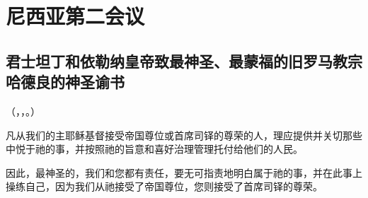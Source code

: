 
\chapter{尼西亚第二会议}



\section{君士坦丁和依勒纳皇帝致最神圣、最蒙福的旧罗马教宗哈德良的神圣谕书}

（，，。）\par

凡从我们的主耶稣基督接受帝国尊位或首席司铎的尊荣的人，理应提供并关切那些中悦于祂的事，并按照祂的旨意和喜好治理管理托付给他们的人民。\par

因此，最神圣的，我们和您都有责任，要无可指责地明白属于祂的事，并在此事上操练自己，因为我们从祂接受了帝国尊位，您则接受了首席司铎的尊荣。\par

